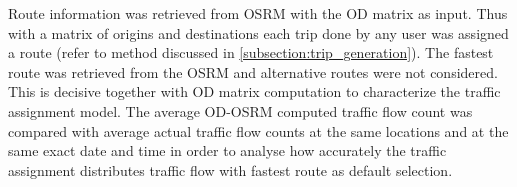 \documentclass[12pt, a4paper]{report}
\theoremstyle{definition}
\theoremstyle{definition}%
\theoremstyle{definition}%
\theoremstyle{definition}%
\theoremstyle{definition}%
\theoremstyle{definition}%
\begin{document}
Route information was retrieved from OSRM with the OD matrix as input. Thus with a matrix of origins and destinations each trip done by any user was assigned a route (refer to method discussed in \ref{subsection:trip_generation}). The fastest route was retrieved from the OSRM and alternative routes were not considered. This is decisive together with OD matrix computation to characterize the traffic assignment model. The average OD-OSRM computed traffic flow count was compared with average actual traffic flow counts at the same locations and at the same exact date and time in order to analyse how accurately the traffic assignment distributes traffic flow with fastest route as default selection.



\end{document}
